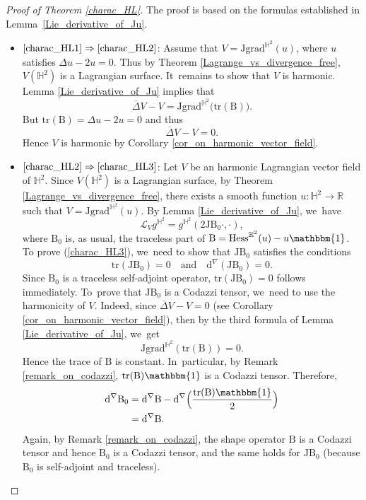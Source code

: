 \documentclass[JEP,XML,SOM,Unicode,NoEqCountersInSection, NoFloatCountersInSection,published]{cedram}
\theoremstyle{plain}
\theoremstyle{definition}
\newcommand{\grad}{\mathrm{grad}^{\mathbb{H}^2}}
\newcommand{\hess}{\mathrm{Hess}^{\mathbb{H}^2}}
\newcommand{\J}{\mathrm{J}}
\newcommand{\B}{\mathrm{B}}
\begin{document}
\pagebreak[2]
\begin{proof}[Proof of Theorem \ref{charac_HL}]
The proof is based on the formulas established in Lem\-ma~\ref{Lie_derivative_of_Ju}.

\begin{itemize}
\item
$\eqref{charac_HL1}\Rightarrow\eqref{charac_HL2}$: Assume that \(V = \J \grad(u) \), where \(u \) satisfies \(\Delta u - 2u = 0\). Thus by Theorem \ref{Lagrange_vs_divergence_free}, \(V(\mathbb{H}^2) \) is a Lagrangian surface. It~remains to show that \(V \) is harmonic. Lemma \ref{Lie_derivative_of_Ju} implies that
\[\overline{\Delta} V - V = \J \grad\bigl(\mathrm{tr}(\B)\bigr).\]
But \(\mathrm{tr}(\B) = \Delta u - 2u = 0\) and thus
\[\overline{\Delta} V - V = 0.\]
Hence \(V \) is harmonic by Corollary \ref{cor_on_harmonic_vector_field}.

\item
$\eqref{charac_HL2}\Rightarrow\eqref{charac_HL3}$: Let $V$ be an harmonic Lagrangian vector field of $\mathbb{H}^2$. Since $V(\mathbb{H}^2)$ is a Lagrangian surface, by Theorem \ref{Lagrange_vs_divergence_free}, there exists a smooth function $u:\mathbb{H}^2 \to \mathbb{R}$ such that $V = \J\grad(u)$. By Lemma \ref{Lie_derivative_of_Ju}, we~have
\[ \mathcal{L}_Vg^{\mathbb{H}^2} = g^{\mathbb{H}^2}(2\J\B_0 \cdot, \cdot), \]
where $\B_0$ is, as usual, the traceless part of $\B = \hess(u) - u\mathbbm{1}$. To prove (\ref{charac_HL3}), we~need to show that $\J\B_0$ satisfies the conditions
\[
\mathrm{tr}(\J\B_0) = 0 \quad \text{and} \quad \mathrm{d}^{\nabla}(\J\B_0) = 0.
\]
Since $\B_0$ is a traceless self-adjoint operator, $\mathrm{tr}(\J\B_0) = 0$ follows immediately. To~prove that $\J\B_0$ is a Codazzi tensor, we~need to use the harmonicity of $V$. Indeed, since $\overline{\Delta}V - V = 0$ (see Corollary \ref{cor_on_harmonic_vector_field}), then by the third formula of Lemma \ref{Lie_derivative_of_Ju}, we~get
\[ \J\grad\left(\mathrm{tr}(\B)\right) = 0. \]
Hence the trace of $\B$ is constant. In~particular, by Remark \ref{remark_on_codazzi}, $\mathrm{tr}(\B)\mathbbm{1}$ is a Codazzi tensor. Therefore,
\begin{align*}
\mathrm{d}^{\nabla}\B_0 &= \mathrm{d}^{\nabla}\B - \mathrm{d}^{\nabla}\Bigl(\frac{\mathrm{tr}(\B)\mathbbm{1}}{2} \Bigr) \\
&= \mathrm{d}^{\nabla}\B.
\end{align*}
Again, by Remark \ref{remark_on_codazzi}, the shape operator $\B$ is a Codazzi tensor and hence $\B_0$ is a Codazzi tensor, and the same holds for $\J\B_0$ (because $\B_0$ is self-adjoint and traceless).


\end{itemize}
\end{proof}
\end{document}
